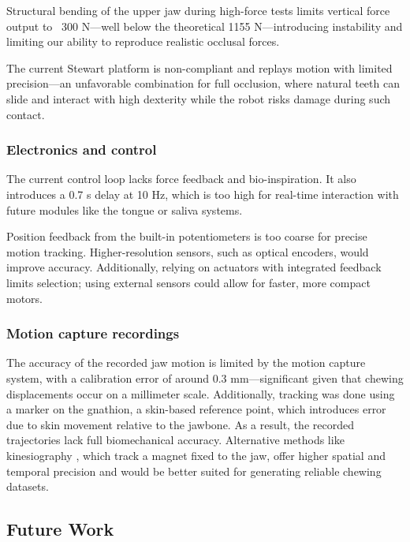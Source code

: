 Structural bending of the upper jaw during high-force tests limits vertical force output to ~300 N—well below the theoretical 1155 N—introducing instability and limiting our ability to reproduce realistic occlusal forces. 

The current Stewart platform is non-compliant and replays motion with limited precision—an unfavorable combination for full occlusion, where natural teeth 
can slide and interact with high dexterity while the robot risks damage during such contact.

\subsubsection{Electronics and control}

The current control loop lacks force feedback and bio-inspiration. It also introduces a 0.7 s delay at 10 Hz, which is too high for real-time interaction 
with future modules like the tongue or saliva systems. 

Position feedback from the built-in potentiometers is too coarse for precise motion tracking. Higher-resolution sensors, such as optical encoders, would improve accuracy. 
Additionally, relying on actuators with integrated feedback limits selection; using external sensors could allow for faster, more compact motors.

\subsubsection{Motion capture recordings}
\label{sec:motion_capture_limitations}

The accuracy of the recorded jaw motion is limited by the motion capture system, with a calibration error of around 0.3 mm—significant given that chewing displacements 
occur on a millimeter scale. Additionally, tracking was done using a marker on the gnathion, a skin-based reference point, which introduces error due to skin movement 
relative to the jawbone. As a result, the recorded trajectories lack full biomechanical accuracy. Alternative methods like kinesiography \cite{kinesiograph}, which track a magnet fixed to 
the jaw, offer higher spatial and temporal precision and would be better suited for generating reliable chewing datasets.

\subsection{Future Work}

